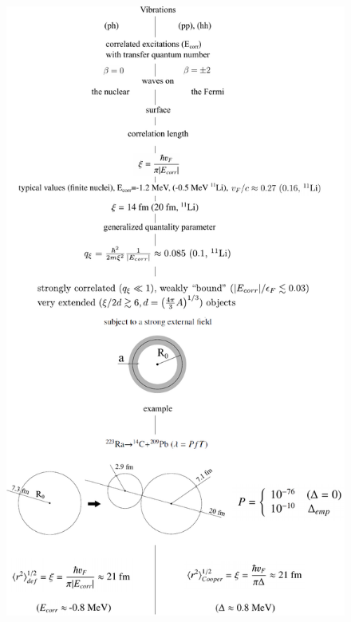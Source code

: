        \begin{figure}
       	\centerline{\includegraphics*[width=13cm,angle=0]{nutshell/figs/fig3B3x}}
       	\caption{}\label{fig3B3x} 
       \end{figure}
